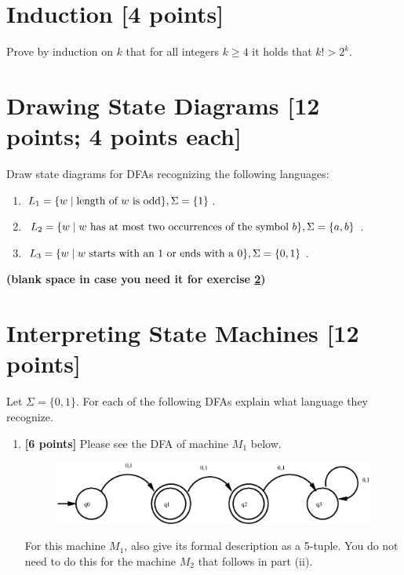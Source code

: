\newpage
\section{Induction [4 points]}
Prove by induction on $k$ that for all integers $k \ge 4$ it holds that $k! > 2^k$.


\newpage
\section{Drawing State Diagrams [12 points; 4 points each]}\label{sec:drawing}
Draw state diagrams for DFAs recognizing the following languages:
\begin{enumerate}[label=(\roman*)]
\item $L_1 = \{w \mid \text{length of \ensuremath{w} is odd}\}, \Sigma = \{1\}$.
\item $L_2 = \{w \mid \mbox{\ensuremath{w} has at most two occurrences of the symbol \ensuremath{b}}\}, \Sigma = \{a, b\}$.
\item $L_3 = \{w \mid \mbox{\ensuremath{w} starts with an \ensuremath{1} or ends with a \ensuremath{0}}\}, \Sigma = \{0, 1\}$.
\end{enumerate}



\newpage
\begin{center}\textbf{(blank space in case you need it for exercise \ref{sec:drawing})}\end{center}


\newpage
\section{Interpreting State Machines [12 points]}\label{sec:interpreting}
Let $\Sigma = \{0, 1\}$.
For each of the following DFAs explain what language they recognize.%

\begin{enumerate}[label=(\roman*)]
\item \textbf{[6 points]}
Please see the DFA of machine $M_1$ below.
\begin{figure}[h]
\begin{center}
{
\includegraphics[width=0.5\columnwidth]{figs/dfa2}
}
\end{center}
\end{figure}
For this machine $M_1$, also give its formal description as a 5-tuple. 
You do not need to do this for the machine $M_2$ that follows in part (ii).
\end{enumerate}

